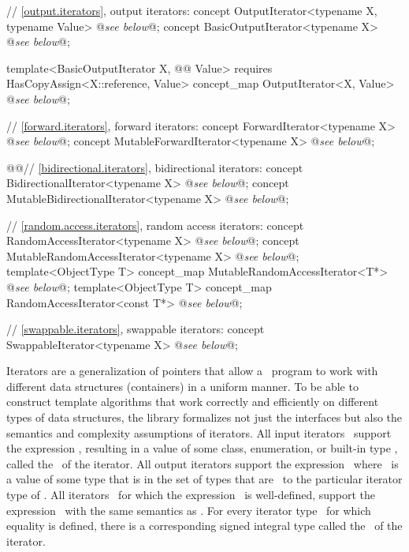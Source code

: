 \documentclass[american,twoside]{book}
\begin{document}
\begin{paras}
\begin{codeblock}
{  // \ref{output.iterators}, output iterators:
  concept OutputIterator<typename X, typename Value> @\textit{see below}@;
  concept BasicOutputIterator<typename X> @\textit{see below}@;

  template<BasicOutputIterator X, @@ Value>
    requires HasCopyAssign<X::reference, Value>
    concept_map OutputIterator<X, Value> @\textit{see below}@;

  // \ref{forward.iterators}, forward iterators:
  concept ForwardIterator<typename X> @\textit{see below}@;
  concept MutableForwardIterator<typename X> @\textit{see below}@;

  @\textcolor{addclr}{}@// \ref{bidirectional.iterators}, bidirectional iterators:
  concept BidirectionalIterator<typename X> @\textit{see below}@;
  concept MutableBidirectionalIterator<typename X> @\textit{see below}@;

  // \ref{random.access.iterators}, random access iterators:
  concept RandomAccessIterator<typename X> @\textit{see below}@;
  concept MutableRandomAccessIterator<typename X> @\textit{see below}@;
  template<ObjectType T> concept_map MutableRandomAccessIterator<T*> @\textit{see below}@;
  template<ObjectType T> concept_map RandomAccessIterator<const T*> @\textit{see below}@;

  // \ref{swappable.iterators}, swappable iterators:
  concept SwappableIterator<typename X> @\textit{see below}@;
}
\end{codeblock}
\color{black}

\pnum
{}%
Iterators are a generalization of pointers that allow a \Cpp\ program to work with different data structures
(containers) in a uniform manner.
To be able to construct template algorithms that work correctly and
efficiently on different types of data structures, the library formalizes not just the interfaces but also the
semantics and complexity assumptions of iterators.
All input iterators
\
support the expression
,
resulting in a value of some class, enumeration, or built-in type
\tcode{T},
called the
\ 
of the iterator.
All output iterators support the expression
\
where
\tcode{o}\
is a value of some type that is in the set of types that are
\
to the particular iterator type of
.
All iterators
\tcode{i}\
for which the expression
\
is well-defined, support the expression
\tcode{i->m}\
with the same semantics as
\tcode{(*i).m}.
For every iterator type
\tcode{X}\
for which
equality is defined, there is a corresponding signed integral type called the
\ 
of the iterator.


\end{paras}
\end{document}
